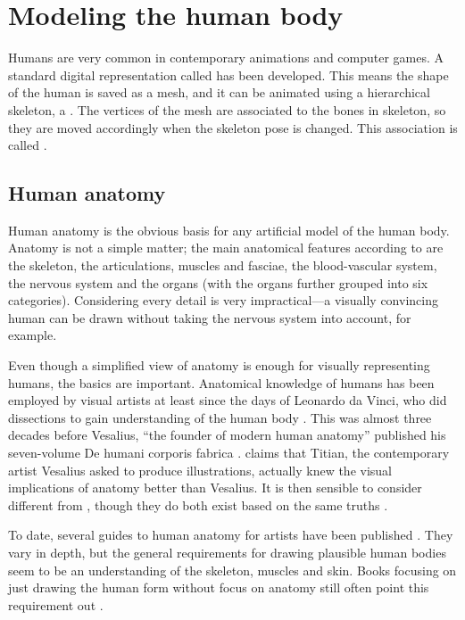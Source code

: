 \section{Modeling the human body}

Humans are very common in contemporary animations and computer games. A standard digital representation called  has been developed. This means the shape of the human is saved as a mesh, and it can be animated using a hierarchical skeleton, a . The vertices of the mesh are associated to the bones in skeleton, so they are moved accordingly when the skeleton pose is changed. This association is called .

\subsection{Human anatomy}

Human anatomy is the obvious basis for any artificial model of the human body. Anatomy is not a simple matter; the main anatomical features according to  \citep{pick1977gray} are the skeleton, the articulations, muscles and fasciae, the blood-vascular system, the nervous system and the organs (with the organs further grouped into six categories). Considering every detail is very impractical---a visually convincing human can be drawn without taking the nervous system into account, for example.

Even though a simplified view of anatomy is enough for visually representing humans, the basics are important. Anatomical knowledge of humans has been employed by visual artists at least since the days of Leonardo da Vinci,
who did dissections to gain understanding of the human body \citep{keele1964leonardo}. This was almost three decades before Vesalius, ``the founder of modern human anatomy'' published his seven-volume De humani corporis fabrica \citep{vesalius1543}. \citet{hogarth2003} claims that Titian, the contemporary artist Vesalius asked to produce illustrations, actually knew the visual implications of anatomy better than Vesalius. It is then sensible to consider  different from , though they do both exist based on the same truths \citep{hogarth2003}.

To date, several guides to human anatomy for artists have been published \autocites{goldfinger1991}{simblet2001}{hogarth2003}{ediciones2004}. They vary in depth, but the general requirements for drawing plausible human bodies seem to be an understanding of the skeleton, muscles and skin. Books focusing on just drawing the human form without focus on anatomy still often point this requirement out \autocites{ediciones2004}{loomis1943figure}.

